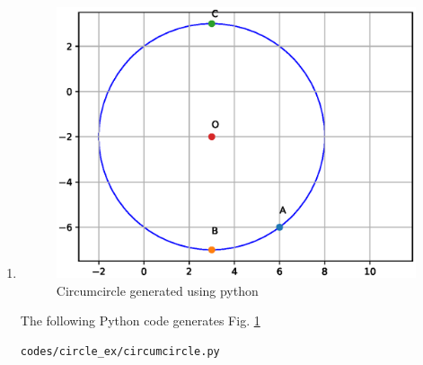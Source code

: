 \begin{enumerate}[label=\thesubsection.\arabic*.,ref=\thesubsection.\theenumi]
\item \begin{figure}[!ht]
\centering
\includegraphics[width=\columnwidth]{./figs/circle_ex/circumcircle.eps}
\caption{Circumcircle generated using python}
\label{fig:Circumcircle2_circle_ex}
\end{figure} 

The following Python code generates Fig. \ref{fig:Circumcircle2_circle_ex}

\begin{lstlisting}
codes/circle_ex/circumcircle.py
\end{lstlisting}
\end{enumerate}



